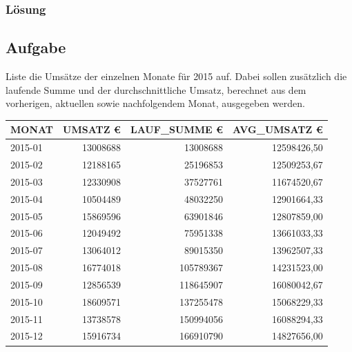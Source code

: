 \subsubsection*{Lösung}
\label{sec:uebung_07.aufgabe_03.loesung}


\subsection{Aufgabe}
\label{sec:uebung_07.aufgabe_04}
Liste die Umsätze der einzelnen Monate für 2015 auf. Dabei sollen zusätzlich die laufende Summe und der durchschnittliche Umsatz, berechnet aus dem vorherigen, aktuellen sowie nachfolgendem Monat, ausgegeben werden.

\begin{table}[H]
  \centering
  \ttfamily
  \begin{tabular}{|l|r|r|r|}
    \hline
    \textbf{MONAT}  & \textbf{UMSATZ €} & \textbf{LAUF\_SUMME €}  & \textbf{AVG\_UMSATZ €}  \\
    \hline
    2015-01         & 13008688          & 13008688                & 12598426,50             \\
    2015-02         & 12188165          & 25196853                & 12509253,67             \\
    2015-03         & 12330908          & 37527761                & 11674520,67             \\
    2015-04         & 10504489          & 48032250                & 12901664,33             \\
    2015-05         & 15869596          & 63901846                & 12807859,00             \\
    2015-06         & 12049492          & 75951338                & 13661033,33             \\
    2015-07         & 13064012          & 89015350                & 13962507,33             \\
    2015-08         & 16774018          & 105789367               & 14231523,00             \\
    2015-09         & 12856539          & 118645907               & 16080042,67             \\
    2015-10         & 18609571          & 137255478               & 15068229,33             \\
    2015-11         & 13738578          & 150994056               & 16088294,33             \\
    2015-12         & 15916734          & 166910790               & 14827656,00             \\
    \hline
  \end{tabular}
\end{table}


